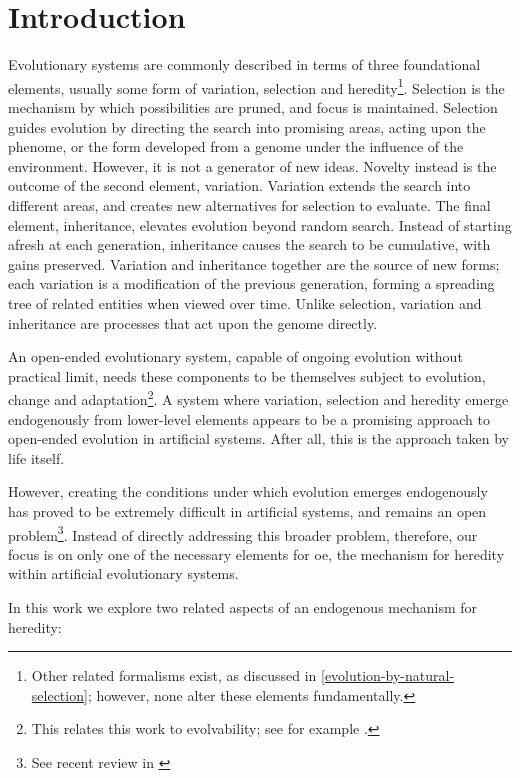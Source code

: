 \chapter{Introduction}

Evolutionary systems are commonly described in terms of three foundational elements, usually some form of variation, selection and heredity\footnote{Other related formalisms exist, as discussed in  \cref{evolution-by-natural-selection}; however, none alter these elements fundamentally.}. Selection is the mechanism by which possibilities are pruned, and focus is maintained. Selection guides evolution by directing the search into promising areas, acting upon the phenome, or the form developed from a genome under the influence of the environment. However, it is not a generator of new ideas. Novelty instead is the outcome of the second element, variation. Variation extends the search into different areas, and creates new alternatives for selection to evaluate. The final element, inheritance, elevates evolution beyond random search. Instead of starting afresh at each generation, inheritance causes the search to be cumulative, with gains preserved. Variation and inheritance together are the source of new forms; each variation is a modification of the previous generation, forming a spreading tree of related entities when viewed over time. Unlike selection, variation and inheritance are processes that act upon the genome directly.

An open-ended evolutionary system, capable of ongoing evolution without practical limit, needs these components to be themselves subject to evolution, change and adaptation\footnote{This relates this work to evolvability; see for example \textcite{Pigliucci2008,Wagner:1996kc,Wagner:2008mi}.}. A system where variation, selection and heredity emerge endogenously from lower-level elements appears to be a promising approach to open-ended evolution in artificial systems. After all, this is the approach taken by life itself.

However, creating the conditions under which evolution emerges endogenously has proved to be extremely difficult in artificial systems, and remains an open problem\footnote{See recent review in \cite{BanzhafBaumgaertnerBeslonEtAl2016}}. Instead of directly addressing this broader problem, therefore, our focus is on only one of the necessary elements for \gls{oe}, the mechanism for heredity within artificial evolutionary systems.

In this work we explore two related aspects of an endogenous mechanism for heredity:


